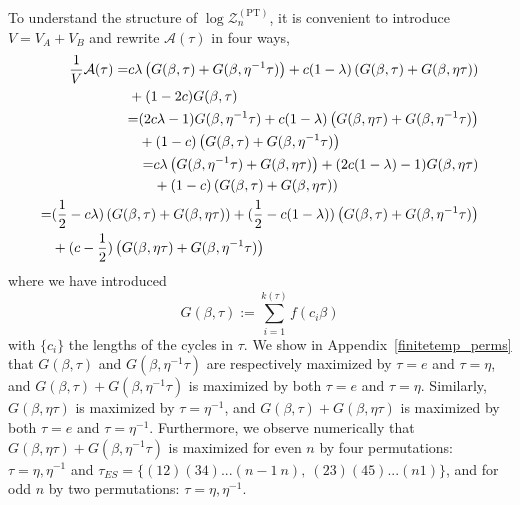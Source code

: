 \documentclass[a4paper,11pt]{article}
\newcommand{\Zpt}{\sZ_n^{(\text{PT})}}
\newcommand{\be}{\begin{equation}}
\newcommand{\ee}{\end{equation}}
\newcommand\ov{\over}
\newcommand\sA{{\ensuremath{{\mathcal A}}}}
\newcommand\sZ{{\mathcal Z}}
\begin{document}
To understand the structure of $\log \Zpt$, it is convenient to introduce $V = V_A + V_B$ and rewrite 
 $\sA(\tau)$ in four ways,
\begin{align}
\begin{split} 
{1 \ov V} \sA(\tau) =& c\lambda \left(G(\beta, \tau) + G(\beta, \eta^{-1}\tau)\right)+ c(1-\lambda) \left(G(\beta, \tau)+G( \beta, \eta\tau)\right) \\ &+ (1-2c) G(\beta, \tau)\end{split}\label{abeta1} \\
\begin{split} = & (2c\lambda-1)G(\beta, \eta^{-1}\tau) + c(1-\lambda) \left(G(\beta, \eta\tau)+G( \beta, \eta^{-1}\tau)\right) \\ &+ (1-c) \left(G(\beta, \tau)+ G(\beta, \eta^{-1}\tau)\right) \end{split} \label{abeta2}\\
\begin{split} =& c \lambda \left(G(\beta, \eta^{-1}\tau)+G(\beta, \eta \tau)\right) + (2c(1-\lambda)-1) G(\beta, \eta \tau) \\ &+ (1-c) \left(G(\beta, \tau)+ G(\beta, \eta \tau) \right) 
\end{split} \label{abeta3}\\
\begin{split} =& (\frac{1}{2}-c \lambda)\left(G(\beta, \tau)+G(\beta, \eta\tau)\right) + (\frac{1}{2}-c (1-\lambda))\left(G(\beta, \tau)+G(\beta, \eta^{-1}\tau)\right) \\ &+ (c-\frac{1}{2}) \left(G(\beta, \eta\tau)+ G(\beta, \eta^{-1}\tau)\right) 
\end{split} \label{abeta4} 
\end{align} 
where we have introduced 
\be 
G(\beta, \tau) := \sum_{i=1}^{k(\tau)} f(c_i \beta) \label{func_G}
\ee
with $\{c_i\}$ the lengths of the cycles in $\tau$. We show in Appendix~\ref{finitetemp_perms} that $G(\beta, \tau)$ and $G(\beta, \eta^{-1}\tau)$ are respectively maximized by $\tau=e$ and $\tau=\eta$, and 
$G(\beta, \tau)+G( \beta, \eta^{-1}\tau)$ is maximized by both $\tau=e$ and $\tau=\eta$. Similarly, $G(\beta, \eta\tau)$ is maximized by $\tau=\eta^{-1}$, and $G(\beta, \tau)+G( \beta, \eta\tau)$ is maximized by both $\tau=e$ and $\tau=\eta^{-1}$. Furthermore, we observe numerically that $G(\beta, \eta\tau)+ G(\beta, \eta^{-1}\tau)$ is maximized for even $n$ by four permutations: $\tau= \eta, \eta^{-1}$ and $\tau_{ES}= \{(12)(34)...(n-1~n),~ (23)(45)...(n1)\}$, and for odd $n$ by two permutations: $\tau= \eta, \eta^{-1}$. 
\end{document}
